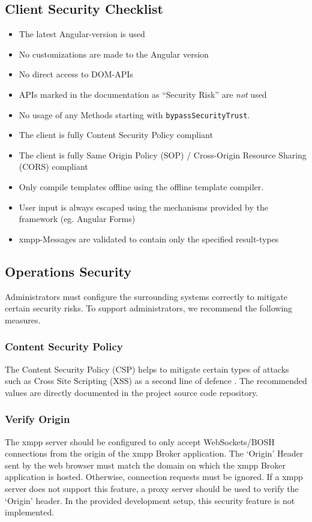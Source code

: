 \subsection{Client Security Checklist}
\begin{itemize}
    \item The latest Angular-version is used
    \item No customizations are made to the Angular version
    \item No direct access to DOM-APIs
    \item APIs marked in the documentation as ``Security Risk'' are \emph{not} used
    \item No usage of any Methods starting with \texttt{bypassSecurityTrust}.
    \item The client is fully Content Security Policy compliant
    \item The client is fully Same Origin Policy (SOP) / Cross-Origin Resource Sharing (CORS) compliant
    \item Only compile templates offline using the offline template compiler.
    \item User input is always escaped using the mechanisms provided by the framework (eg. Angular Forms)
    \item \gls{xmpp}-Messages are validated to contain only the specified result-types
\end{itemize}

\subsection{Operations Security}\label{sec:ops-security}


Administrators must configure the surrounding systems correctly to mitigate certain security risks.
To support administrators, we recommend the following measures.

\subsubsection{Content Security Policy}

The Content Security Policy (CSP) helps to mitigate certain types of attacks such as Cross Site Scripting (XSS) as a second line of defence \cite{w3c-csp}.
The recommended values are directly documented in the project source code repository.

\subsubsection{Verify Origin}
The \gls{xmpp} server should be configured to only accept WebSockets/BOSH connections from the origin of the \gls{xmpp} Broker application.
The `Origin' Header sent by the web browser must match the domain on which the \gls{xmpp} Broker application is hosted.
Otherwise, connection requests must be ignored.
If a \gls{xmpp} server does not support this feature, a proxy server should be used to verify the `Origin' header.
In the provided development setup, this security feature is not implemented.
